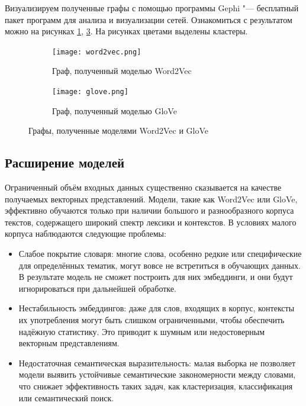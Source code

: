 \documentclass[coursework]{SCWorks}
\begin{document}
Визуализируем полученные графы с помощью программы Gephi "--- бесплатный пакет программ для анализа и визуализации сетей. Ознакомиться с результатом можно на рисунках \ref{fig:graph-word2vec}, \ref{fig:graph-glove}. На рисунках цветами выделены кластеры.
\begin{figure}[!ht]
    \centering
    \begin{subfigure}[b]{0.4\textwidth}
        \centering
        \texttt{[image: word2vec.png]}
        \caption{Граф, полученный моделью Word2Vec}
        \label{fig:graph-word2vec}
    \end{subfigure}
    \begin{subfigure}[b]{0.4\textwidth}
        \centering
        \texttt{[image: glove.png]}
        \caption{Граф, полученный моделью GloVe}
        \label{fig:graph-glove}
    \end{subfigure}
    \caption{Графы, полученные моделями Word2Vec и GloVe}
\end{figure}

\subsection{Расширение моделей}
Ограниченный объём входных данных существенно сказывается на качестве получаемых векторных представлений. Модели, такие как Word2Vec или GloVe, эффективно обучаются только при наличии большого и разнообразного корпуса текстов, содержащего широкий спектр лексики и контекстов. В условиях малого корпуса наблюдаются следующие проблемы:
\begin{itemize}
    \item Слабое покрытие словаря: многие слова, особенно редкие или специфические для определённых тематик, могут вовсе не встретиться в обучающих данных. В результате модель не сможет построить для них эмбеддинги, и они будут игнорироваться при дальнейшей обработке.

    \item Нестабильность эмбеддингов: даже для слов, входящих в корпус, контексты их употребления могут быть слишком ограниченными, чтобы обеспечить надёжную статистику. Это приводит к шумным или недостоверным векторным представлениям.

    \item Недостаточная семантическая выразительность: малая выборка не позволяет модели выявить устойчивые семантические закономерности между словами, что снижает эффективность таких задач, как кластеризация, классификация или семантический поиск.
\end{itemize}
\end{document}
